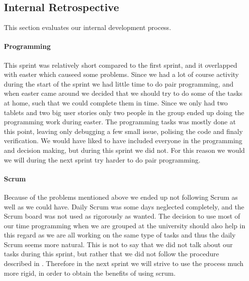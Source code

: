 \subsection{Internal Retrospective}\label{internal2}
This section evaluates our internal development process.
\paragraph{Programming}
This sprint was relatively short compared to the first sprint, and it overlapped with easter which causeed some problems. 
Since we had a lot of course activity during the start of the sprint we had little time to do pair programming, and when easter came around we decided that we should try to do some of the tasks at home, such that we could complete them in time. 
Since we only had two tablets and two big user stories only two people in the group ended up doing the programming work during easter.
The programming tasks was mostly done at this point, leaving only debugging a few small issue, polising the code and finaly verification. 
We would have liked to have included everyone in the programming and decision making, but during this sprint we did not. 
For this reason we would we will during the next sprint try harder to do pair programming. 

\paragraph{Scrum}
Because of the problems mentioned above we ended up not following Scrum as well as we could have.
Daily Scrum was some days neglected completely, and the Scrum board was not used as rigorously as wanted.
The decision to use most of our time programming when we are grouped at the university should also help in this regard as we are all working on the same type of tasks and thus the daily Scrum seems more natural.
This is not to say that we did not talk about our tasks during this sprint, but rather that we did not follow the procedure described in .
Therefore in the next sprint we will strive to use the process much more rigid, in order to obtain the benefits of using scrum.  
